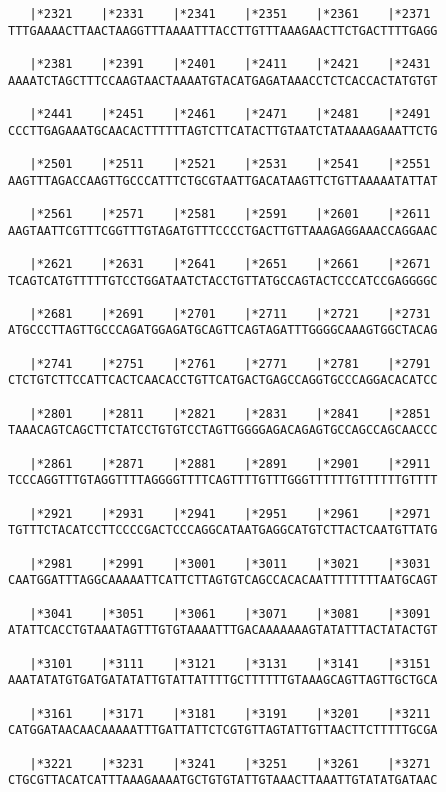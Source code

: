 \documentclass{article}
\begin{document}
\begin{Verbatim}
   |*2321    |*2331    |*2341    |*2351    |*2361    |*2371 
TTTGAAAACTTAACTAAGGTTTAAAATTTACCTTGTTTAAAGAACTTCTGACTTTTGAGG
  
   |*2381    |*2391    |*2401    |*2411    |*2421    |*2431 
AAAATCTAGCTTTCCAAGTAACTAAAATGTACATGAGATAAACCTCTCACCACTATGTGT
  
   |*2441    |*2451    |*2461    |*2471    |*2481    |*2491 
CCCTTGAGAAATGCAACACTTTTTTAGTCTTCATACTTGTAATCTATAAAAGAAATTCTG
  
   |*2501    |*2511    |*2521    |*2531    |*2541    |*2551 
AAGTTTAGACCAAGTTGCCCATTTCTGCGTAATTGACATAAGTTCTGTTAAAAATATTAT
  
   |*2561    |*2571    |*2581    |*2591    |*2601    |*2611 
AAGTAATTCGTTTCGGTTTGTAGATGTTTCCCCTGACTTGTTAAAGAGGAAACCAGGAAC
  
   |*2621    |*2631    |*2641    |*2651    |*2661    |*2671 
TCAGTCATGTTTTTGTCCTGGATAATCTACCTGTTATGCCAGTACTCCCATCCGAGGGGC
  
   |*2681    |*2691    |*2701    |*2711    |*2721    |*2731 
ATGCCCTTAGTTGCCCAGATGGAGATGCAGTTCAGTAGATTTGGGGCAAAGTGGCTACAG
  
   |*2741    |*2751    |*2761    |*2771    |*2781    |*2791 
CTCTGTCTTCCATTCACTCAACACCTGTTCATGACTGAGCCAGGTGCCCAGGACACATCC
  
   |*2801    |*2811    |*2821    |*2831    |*2841    |*2851 
TAAACAGTCAGCTTCTATCCTGTGTCCTAGTTGGGGAGACAGAGTGCCAGCCAGCAACCC
  
   |*2861    |*2871    |*2881    |*2891    |*2901    |*2911 
TCCCAGGTTTGTAGGTTTTAGGGGTTTTCAGTTTTGTTTGGGTTTTTTGTTTTTTGTTTT
  
   |*2921    |*2931    |*2941    |*2951    |*2961    |*2971 
TGTTTCTACATCCTTCCCCGACTCCCAGGCATAATGAGGCATGTCTTACTCAATGTTATG
  
   |*2981    |*2991    |*3001    |*3011    |*3021    |*3031 
CAATGGATTTAGGCAAAAATTCATTCTTAGTGTCAGCCACACAATTTTTTTTAATGCAGT
  
   |*3041    |*3051    |*3061    |*3071    |*3081    |*3091 
ATATTCACCTGTAAATAGTTTGTGTAAAATTTGACAAAAAAAGTATATTTACTATACTGT
  
   |*3101    |*3111    |*3121    |*3131    |*3141    |*3151 
AAATATATGTGATGATATATTGTATTATTTTGCTTTTTTGTAAAGCAGTTAGTTGCTGCA
  
   |*3161    |*3171    |*3181    |*3191    |*3201    |*3211 
CATGGATAACAACAAAAATTTGATTATTCTCGTGTTAGTATTGTTAACTTCTTTTTGCGA
  
   |*3221    |*3231    |*3241    |*3251    |*3261    |*3271 
CTGCGTTACATCATTTAAAGAAAATGCTGTGTATTGTAAACTTAAATTGTATATGATAAC
  

\end{Verbatim}
\end{document}
